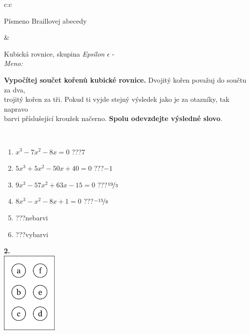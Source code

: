 \documentclass[10pt]{report}
\begin{document}
\begin{tabular}{c:c}
\begin{minipage}[c][104.5mm][t]{0.5\linewidth}
\begin{center}
\begin{minipage}{0.20\linewidth}
\begin{center}
{\small Písmeno Braillovej abecedy}
\end{center}
\end{minipage}
\end{center}
\end{minipage}
&
\begin{minipage}[c][104.5mm][t]{0.5\linewidth}
\begin{center}
\vspace{7mm}
{\huge Kubická rovnice, skupina \textit{Epsilon $\epsilon$} -}\\[5mm]
\textit{Meno:}\phantom{xxxxxxxxxxxxxxxxxxxxxxxxxxxxxxxxxxxxxxxxxxxxxxxxxxxxxxxxxxxxxxxxx}\\[5mm]
\begin{minipage}{0.95\linewidth}
\textbf{Vypočítej součet kořenů kubické rovnice.} Dvojitý kořen považuj do součtu za dva,\\trojitý kořen za tři. Pokud ti vyjde stejný výsledek jako je za otazníky, tak napravo\\barvi příslušející kroužek načerno. \textbf{Spolu odevzdejte výsledné slovo}.
\end{minipage}
\\[1mm]
\begin{minipage}{0.79\linewidth}
\begin{center}
\begin{varwidth}{\linewidth}
\begin{enumerate}
\Large
\item $x^3-7x^2-8x=0$\quad \dotfill\; ???\;\dotfill \quad $7$
\item $5x^3+5x^2-50x+40=0$\quad \dotfill\; ???\;\dotfill \quad $-1$
\item $9x^3-57x^2+63x-15=0$\quad \dotfill\; ???\;\dotfill \quad $\nicefrac{19}{3}$
\item $8x^3-x^2-8x+1=0$\quad \dotfill\; ???\;\dotfill \quad $\nicefrac{-15}{8}$
\item \quad \dotfill\; ???\;\dotfill \quad nebarvi
\item \quad \dotfill\; ???\;\dotfill \quad vybarvi
\end{enumerate}
\end{varwidth}
\end{center}
\end{minipage}
\begin{minipage}{0.20\linewidth}
\begin{center}
{\Huge\bfseries 2.} \\[2mm]
\includegraphics[height=40mm]{../images/braille.png}

\end{center}
\end{minipage}
\end{center}
\end{minipage}
\end{tabular}
\end{document}
